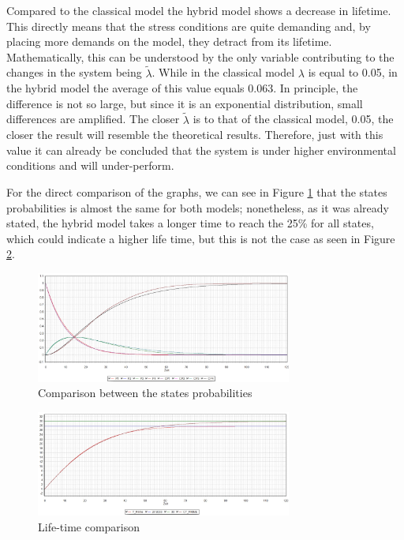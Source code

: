 \documentclass{article}
\begin{document}
\begin{doublespacing}
\par Compared to the classical model the hybrid model shows a decrease in lifetime. This directly means that the stress conditions are quite demanding and, by placing more demands on the model, they detract from its lifetime. Mathematically, this can be understood by the only variable contributing to the changes in the system being $\tilde{\lambda}$. While in the classical model $\lambda$ is equal to 0.05, in the hybrid model the average of this value equals 0.063. In principle, the difference is not so large, but since it is an exponential distribution, small differences are amplified. The closer $\tilde{\lambda}$ is to that of the classical model, 0.05, the closer the result will resemble the theoretical results. Therefore, just with this value it can already be concluded that the system is under higher environmental conditions and will under-perform. 

\par For the direct comparison of the graphs, we can see in Figure \ref{fig:CSP} that the states probabilities is almost the same for both models; nonetheless, as it was already stated, the hybrid model takes a longer time to reach the 25\% for all states, which could indicate a higher life time, but this is not the case as seen in Figure \ref{fig:CLT}.
\begin{figure}[H] 
    \centering
    \includegraphics[width=0.75\textwidth]{Images/ComparisonStates.JPG} 
    \caption{Comparison between the states probabilities} 
    \label{fig:CSP} 
\end{figure}

\begin{figure}[H] 
    \centering
    \includegraphics[width=0.75\textwidth]{Images/ComparisonTL.JPG} 
    \caption{Life-time comparison} 
    \label{fig:CLT} 
\end{figure}


\end{doublespacing}
\end{document}
